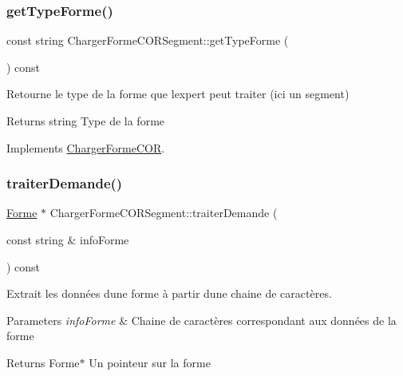 \subsubsection{\texorpdfstring{get\+Type\+Forme()}{getTypeForme()}}
{\footnotesize\ttfamily const string Charger\+Forme\+C\+O\+R\+Segment\+::get\+Type\+Forme (\begin{DoxyParamCaption}{ }\end{DoxyParamCaption}) const\hspace{0.3cm}{\ttfamily [virtual]}}



Retourne le type de la forme que l\textquotesingle{}expert peut traiter (ici un segment) 

\begin{DoxyReturn}{Returns}
string Type de la forme 
\end{DoxyReturn}


Implements \hyperlink{class_charger_forme_c_o_r_ae740eabcd9b3cc3809c1fe5ffd0100a1}{Charger\+Forme\+C\+OR}.

\mbox{\label{class_charger_forme_c_o_r_segment_ac7998f4a2669a3f88dc0b204af187780}} 
\subsubsection{\texorpdfstring{traiter\+Demande()}{traiterDemande()}}
{\footnotesize\ttfamily \hyperlink{class_forme}{Forme} $\ast$ Charger\+Forme\+C\+O\+R\+Segment\+::traiter\+Demande (\begin{DoxyParamCaption}\item[{const string \&}]{info\+Forme }\end{DoxyParamCaption}) const\hspace{0.3cm}{\ttfamily [virtual]}}



Extrait les données d\textquotesingle{}une forme à partir d\textquotesingle{}une chaine de caractères. 


\begin{DoxyParams}{Parameters}
{\em info\+Forme} & Chaine de caractères correspondant aux données de la forme \\
\hline
\end{DoxyParams}
\begin{DoxyReturn}{Returns}
Forme$\ast$ Un pointeur sur la forme 
\end{DoxyReturn}



